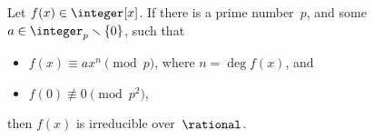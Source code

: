  
 


%
%
%
%
%
%

\begin{lem} \label{Eisenstein}
 Let $f(x) \in \integer[x]$. If there
is a prime number~$p$, and some $a \in \integer_p
\smallsetminus \{0\}$, such that 
 \begin{itemize}
 \item $f(x) \equiv a x^n \pmod{p}$, where $n = \deg f(x)$,
and
 \item $f(0) \not\equiv 0 \pmod{p^2}$,
 \end{itemize}
 then $f(x)$ is irreducible over~$\rational$.
 \end{lem}

